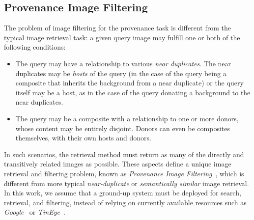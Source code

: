 \subsection{Provenance Image Filtering}
\label{sec:prop:filtering}
The problem of image filtering for the provenance task is different from the typical image retrieval task: a given query image may %
fulfill one or both of the following conditions:

\begin{itemize}
    \item The query may have a relationship to various \emph{near duplicates}. The near duplicates may be \emph{hosts} of the query (in the case of the query being a composite that inherits the background from a near duplicate) or the query itself may be a host, as in the case of the query donating a background to the near duplicates.
    
    \item The query may be a composite with a relationship to one or more donors, whose content may be entirely disjoint.
    Donors can even be composites themselves, with their own hosts and donors.
\end{itemize}

In such scenarios, the retrieval method must return as many of the directly and transitively related images as possible.
These aspects define a unique image retrieval and filtering problem, known as \emph{Provenance Image Filtering}~\cite{pinto2017filtering, nist2017plan}, which is different from more typical \emph{near-duplicate} or \emph{semantically similar} image retrieval.
In this work, we assume that a ground-up system must be deployed for search, retrieval, and filtering, instead of relying on currently available resources such as \emph{Google}~\cite{barroso2003web} or \emph{TinEye}~\cite{jacquicheng}.
 
